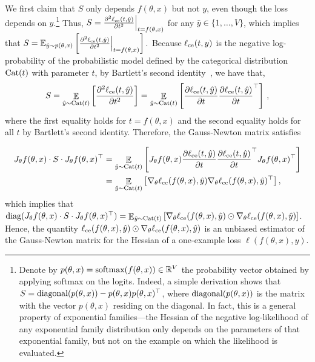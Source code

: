 We first claim that $S$ only depends $f(\theta, x)$ but not $y$, even though the loss depends on $y$.\footnote{Denote by $p(\theta,x)=\textup{softmax}(f(\theta,x))\in \mathbb{R}^V$ the probability vector obtained by applying softmax on the logits. Indeed, a simple derivation shows that $S = \textup{diagonal}(p(\theta,x)) - p(\theta,x)p(\theta,x)^\top$, where $\textup{diagonal}(p(\theta,x))$ is the matrix with the vector $p(\theta,x)$ residing on the diagonal. In fact, this is a general property of exponential families---the Hessian of the negative log-likelihood of any exponential family distribution only depends on the parameters of that exponential family, but not on the example on which the likelihood is evaluated.} 
Thus, $S = \frac{\partial^2 \ell_{\textup{ce}}(t,\hat{y})}{\partial t^2}\Big\vert_{t=f(\theta, x)}$ for any $\hat{y} \in \{1,\dots, V\}$, which implies that
$S = \mathbb{E}_{\hat{y}\sim p(\theta,x)}\left[\frac{\partial^2 \ell_{\textup{ce}}(t,\hat{y})}{\partial t^2}\Big\vert_{t=f(\theta, x)}\right].$ Because $\ell_{\textup{ce}}(t,y)$ is the negative log-probability of the probabilistic model defined by the categorical distribution $\textup{Cat}(t)$ with parameter $t$, by Bartlett's second identity~\citep{bartlett1953approximate}, we have that, 
\begin{align}
S = \mathop{\mathbb{E}}_{\hat{y}\sim \textup{Cat}(t)}\left[\frac{\partial^2 \ell_{\textup{ce}}(t,\hat{y})}{\partial t^2}\right] = \mathop{\mathbb{E}}_{\hat{y}\sim \textup{Cat}(t)}\left[\frac{\partial \ell_{\textup{ce}}(t,\hat{y})}{\partial t}\frac{\partial \ell_{\textup{ce}}(t,\hat{y})}{\partial t}^\top\right]\,,
\end{align}
where the first equality holds for $t = f(\theta,x)$ and the second equality holds for all $t$ by Bartlett's second identity.
Therefore, the Gauss-Newton matrix satisfies 


\begin{align}
    J_\theta f(\theta,x) \cdot S \cdot  J_\theta f(\theta, x)^\top & =  \mathop{\mathbb{E}}_{\hat{y}\sim \textup{Cat}(t)}\left[J_\theta f(\theta,x) \frac{\partial \ell_{\textup{ce}}(t,\hat{y})}{\partial t}\frac{\partial \ell_{\textup{ce}}(t,\hat{y})}{\partial t}^\top J_\theta f(\theta, x)^\top\right]   \nonumber\\
    & = \mathop{\mathbb{E}}_{\hat{y}\sim \textup{Cat}(t)}\left[
        \nabla_\theta \ell_{\textup{ce}}(f(\theta,x),\hat{y})   \nabla_\theta \ell_{\textup{ce}}(f(\theta,x),\hat{y})^\top 
    \right], \label{eqn:24}
\end{align}
which implies that $\textup{diag}(J_\theta f(\theta,x) \cdot S \cdot  J_\theta f(\theta, x)^\top) = \mathop{\mathbb{E}}_{\hat{y}\sim \textup{Cat}(t)}\left[
        \nabla_\theta \ell_{\textup{ce}}(f(\theta,x),\hat{y}) \odot  \nabla_\theta \ell_{\textup{ce}}(f(\theta,x),\hat{y})
    \right]$. Hence, the quantity $\ell_{\textup{ce}}(f(\theta,x),\hat{y}) \odot  \nabla_\theta \ell_{\textup{ce}}(f(\theta,x),\hat{y})$ is an unbiased estimator of the Gauss-Newton matrix for the Hessian of a one-example loss $\ell(f(\theta,x),y)$. 

